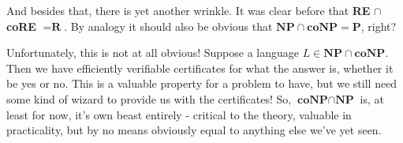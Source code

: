 \par And besides that, there is yet another wrinkle. It was clear before that \textbf{RE} $\cap$ \textbf{coRE} $ = \textbf{R}$. By analogy it should also be obvious that $\textbf{NP} \cap \textbf{coNP} = \textbf{P}$, right?
\par Unfortunately, this is not at all obvious! Suppose a language $L \in \textbf{NP} \cap \textbf{coNP}$. Then we have efficiently verifiable certificates for what the answer is, whether it be yes or no. This is a valuable property for a problem to have, but we still need some kind of wizard to provide us with the certificates! So, $\textbf{coNP} \cap \textbf{NP}$ is, at least for now, it's own beast entirely - critical to the theory, valuable in practicality, but by no means obviously equal to anything else we've yet seen.

